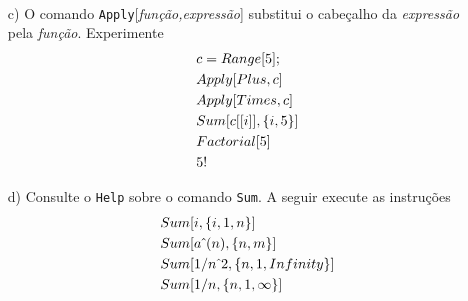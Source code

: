 \documentclass[11pt]{article}
\begin{document}
\begin{itemize}
\[\begin{array}{l}
 \end{array}
\]
  



 \item[c)]   O comando \texttt{Apply}[\textsl{fun\c{c}\~ao,express\~ao}] substitui o cabe\c{c}alho da \textsl{express\~ao} pela \textsl{fun\c{c}\~ao}. Experimente
  \[\begin{array}{l}

c=Range[5];


        \vspace{1mm}
\\

Apply[Plus,c]

        \vspace{1mm}
\\

Apply[Times,c]

        \vspace{1mm}
\\

Sum[c[[i]], \{i, 5\}]

        \vspace{1mm}
\\

Factorial[5]

        \vspace{1mm}
\\

5!

 \end{array}
\]


 \item[d)]  Consulte o \texttt{Help} sobre o comando \texttt{Sum}. A seguir execute as instru\c{c}\~oes
 \[\begin{array}{l}

Sum[i, \{i, 1, n\}]


        \vspace{1mm}
\\

Sum[a\,\hat{}\,(n), \{n, m\}]

        \vspace{1mm}
\\

Sum[1/n\,\hat{}\,2, \{n, 1, Infinity \}]

        \vspace{1mm}
\\

Sum[1/n, \{n, 1,  \infty \}]

        \vspace{1mm}
\\




\end{array}\]
\end{itemize}
\end{document}
